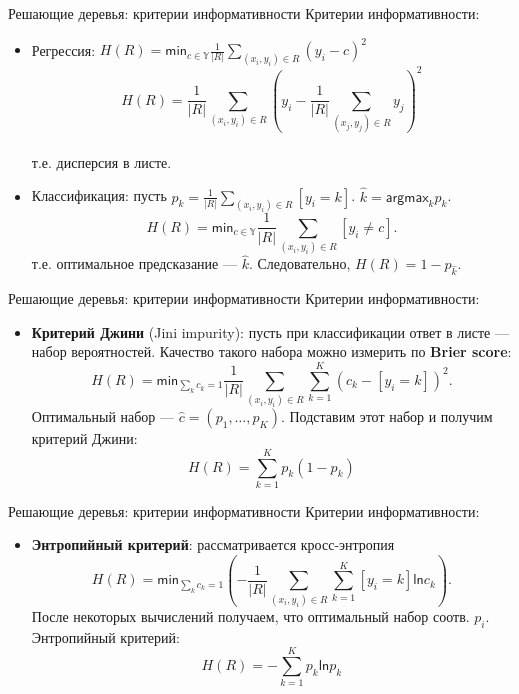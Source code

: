 \documentclass[handout]{beamer}
\begin{document}
\begin{frame}{Решающие деревья: критерии информативности}
	Критерии информативности:
	\begin{itemize}
		\item Регрессия: $H(R) = \mathsf{min}_{c\in \mathbb{Y}}\frac{1}{|R|}\sum_{(x_i, y_i)\in R}(y_i - c)^2$
		\begin{equation*}
			H(R) = \frac{1}{|R|}\sum_{(x_i, y_i)\in R}\left(y_i-\frac{1}{|R|}\sum_{(x_j, y_j)\in R}y_j\right)^2
		\end{equation*}\\
		т.е. дисперсия в листе.
		\item Классификация: пусть $p_k=\frac{1}{|R|}\sum_{(x_i, y_i)\in R}[y_i=k]$. $\hat{k} = \mathsf{argmax}_{k}p_k$.
	\begin{equation*}
		H(R) = \mathsf{min}_{c\in\mathbb{Y}}\frac{1}{|R|}\sum_{(x_i, y_i)\in R}[y_i\neq c].
	\end{equation*}
	т.е. оптимальное предсказание --- $\hat{k}$. Следовательно, $H(R)=1-p_{\hat{k}}$.
	\end{itemize}
\end{frame}

\begin{frame}{Решающие деревья: критерии информативности}
	Критерии информативности:
	\begin{itemize}
		\item \textbf{Критерий Джини} (Jini impurity): пусть при классификации ответ в листе --- набор вероятностей. Качество такого набора можно измерить по \textbf{Brier score}:
		\begin{equation*}
			H(R) = \textsf{min}_{\sum_{k}c_k=1}\frac{1}{|R|}\sum_{(x_i, y_i)\in R}\sum_{k=1}^K(c_k-[y_i=k])^2. 
		\end{equation*}
		Оптимальный набор --- $\hat{c}=(p_1, \dots, p_K)$. Подставим этот набор и получим критерий Джини:
		\begin{equation*}
			H(R)=\sum_{k=1}^Kp_k(1-p_k)
		\end{equation*}
	\end{itemize}
\end{frame}

\begin{frame}{Решающие деревья: критерии информативности}
	Критерии информативности:
	\begin{itemize}
		\item \textbf{Энтропийный критерий}: рассматривается кросс-энтропия
		\begin{equation*}
			H(R) = \mathsf{min}_{\sum_kc_k=1}\left( -\frac{1}{|R|}\sum_{(x_i, y_i)\in R}\sum_{k=1}^K[y_i=k]\mathsf{ln}c_k\right).
		\end{equation*}
		После некоторых вычислений получаем, что оптимальный набор соотв. $p_i$. Энтропийный критерий:
		\begin{equation*}
			H(R)=-\sum_{k=1}^{K}p_k\mathsf{ln}p_k
		\end{equation*}
	\end{itemize}
\end{frame}
\end{document}
